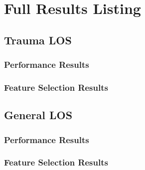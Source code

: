 \chapter{Full Results Listing} \label{app:results}

\section{Trauma LOS}
\subsection{Performance Results}




















\subsection{Feature Selection Results}









\section{General LOS}
\subsection{Performance Results}

\subsection{Feature Selection Results}
